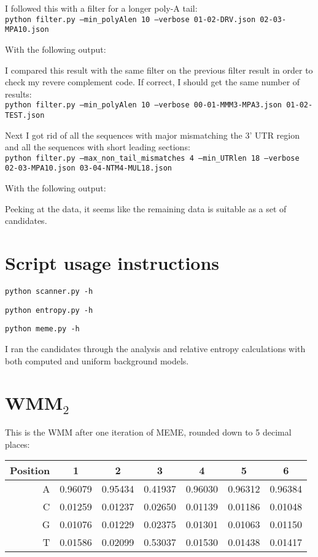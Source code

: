 \documentclass[a4paper, 12pt]{report}
\begin{document}
        I followed this with a filter for a longer poly-A tail: \\
        \texttt{python filter.py --min\_polyAlen 10 --verbose 01-02-DRV.json 02-03-MPA10.json}

        With the following output:
        

        I compared this result with the same filter on the previous filter result
            in order to check my revere complement code.
        If correct, I should get the same number of results: \\
        \texttt{python filter.py --min\_polyAlen 10 --verbose 00-01-MMM3-MPA3.json 01-02-TEST.json}

        Next I got rid of all the sequences with major mismatching the 3' UTR region
            and all the sequences with short leading sections: \\
        \texttt{python filter.py --max\_non\_tail\_mismatches 4 --min\_UTRlen 18 --verbose \\
                02-03-MPA10.json 03-04-NTM4-MUL18.json}

        With the following output:
        
        Peeking at the data, it seems like the remaining data is suitable as a set of candidates.

\section{Script usage instructions}
    \texttt{python scanner.py -h}
    
    \texttt{python entropy.py -h}
    
    \texttt{python meme.py -h}
    

    I ran the candidates through the analysis and relative entropy calculations
        with both computed and uniform background models.
        
\section{WMM$_2$}
    This is the WMM after one iteration of MEME, rounded down to 5 decimal places: \\
    \begin{tabular}{r*{6}{|c}}
        Position & 1 & 2 & 3 & 4 & 5 & 6 \\ \hline
        A & 0.96079 & 0.95434 & 0.41937 & 0.96030 & 0.96312 & 0.96384 \\ \hline
        C & 0.01259 & 0.01237 & 0.02650 & 0.01139 & 0.01186 & 0.01048 \\ \hline
        G & 0.01076 & 0.01229 & 0.02375 & 0.01301 & 0.01063 & 0.01150 \\ \hline
        T & 0.01586 & 0.02099 & 0.53037 & 0.01530 & 0.01438 & 0.01417
    \end{tabular}
\end{document}
